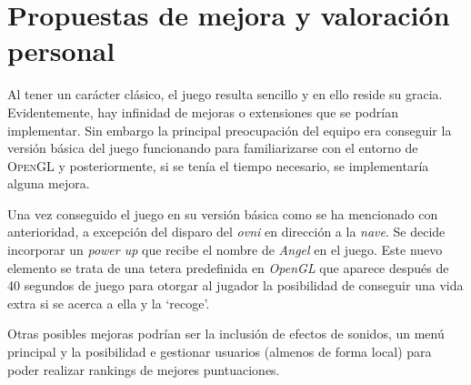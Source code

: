 \section{Propuestas de mejora y valoración personal}
Al tener un carácter clásico, el juego resulta sencillo y en ello reside su gracia. Evidentemente, hay infinidad de mejoras o extensiones que se podrían implementar. Sin embargo la principal preocupación del equipo era conseguir la versión básica del juego funcionando para familiarizarse con el entorno de \textsc{OpenGL} y posteriormente, si se tenía el tiempo necesario, se implementaría alguna mejora.

Una vez conseguido el juego en su versión básica como se ha mencionado con anterioridad, a excepción del disparo del \emph{ovni} en dirección a la \emph{nave}. Se decide incorporar un \emph{power up} que recibe el nombre de \emph{Angel} en el juego. Este nuevo elemento se trata de una tetera predefinida en \emph{OpenGL} que aparece después de 40 segundos de juego para otorgar al jugador la posibilidad de conseguir una vida extra si se acerca a ella y la ‘recoge’.

Otras posibles mejoras podrían ser la inclusión de efectos de sonidos, un menú principal y la posibilidad e gestionar usuarios (almenos de forma local) para poder realizar rankings de mejores puntuaciones.